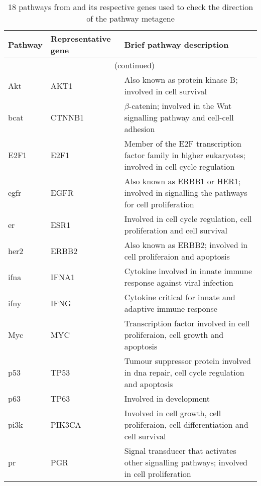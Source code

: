\begin{longtable}{llp{8cm}}
	\caption{18 pathways from \citet{Gatza2010a} and its respective genes used to check the direction of the pathway metagene}
	\label{tab:metagene_direction}\\
	\centering
	Pathway & Representative gene & Brief pathway description\\
	\hline
	\hline
	\endfirsthead
	\multicolumn{3}{c}{\tablename\ \thetable{}\ (continued)}\\
	\hline
	\hline
	\endhead
	\hline
	\hline
	\endlastfoot
	\rule{0pt}{2.25ex}Akt         & AKT1   & Also known as protein kinase B; involved in cell survival\\
	\rule{0pt}{2.25ex}\gls{bcat}  & CTNNB1 & $\beta$-catenin; involved in the Wnt signalling pathway and cell-cell adhesion\\
	\rule{0pt}{2.25ex}E2F1        & E2F1   & Member of the E2F transcription factor family in higher eukaryotes; involved in cell cycle regulation\\
	\rule{0pt}{2.25ex}\Gls{egfr}  & EGFR   & Also known as ERBB1 or HER1; involved in signalling the pathways for cell proliferation \\
	\rule{0pt}{2.25ex}\Gls{er}    & ESR1   & Involved in cell cycle regulation, cell proliferation and cell survival\\
	\rule{0pt}{2.25ex}\Gls{her2}  & ERBB2  & Also known as ERBB2; involved in cell proliferaion and apoptosis\\
	\rule{0pt}{2.25ex}\Gls{ifna}  & IFNA1  & Cytokine involved in innate immune response against viral infection\\
	\rule{0pt}{2.25ex}\Gls{ifny}  & IFNG   & Cytokine critical for innate and adaptive immune response\\
	\rule{0pt}{2.25ex}Myc         & MYC    & Transcription factor involved in cell proliferaion, cell growth and apoptosis\\
	\rule{0pt}{2.25ex}p53         & TP53   & Tumour suppressor protein involved in \acrshort{dna} repair, cell cycle regulation and apoptosis\\
	\rule{0pt}{2.25ex}p63         & TP63   & Involved in development\\
	\rule{0pt}{2.25ex}\Gls{pi3k}  & PIK3CA & Involved in cell growth, cell proliferaion, cell differentiation and cell survival\\
	\rule{0pt}{2.25ex}\Gls{pr}    & PGR    & Signal transducer that activates other signalling pathways; involved in cell proliferation\\

\end{longtable}
